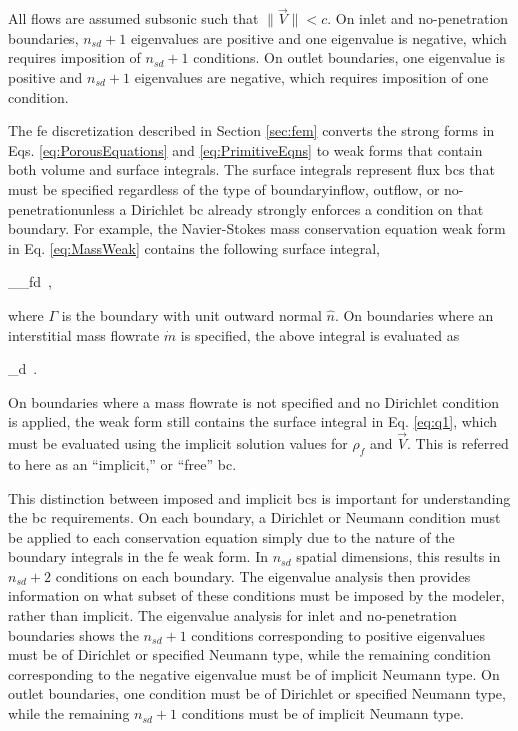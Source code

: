 All flows are assumed subsonic such that \(\|\vec{V}\|<c\). On inlet and no-penetration boundaries, \(n_{sd}+1\) eigenvalues are positive and one eigenvalue is negative, which requires imposition of \(n_{sd}+1\) conditions. On outlet boundaries, one eigenvalue is positive and \(n_{sd}+1\) eigenvalues are negative, which requires imposition of one condition.

The \gls{fe} discretization described in Section \ref{sec:fem} converts the strong forms in Eqs. \eqref{eq:PorousEquations} and \eqref{eq:PrimitiveEqns} to weak forms that contain both volume and surface integrals. The surface integrals represent flux \glspl{bc} that must be specified regardless of the type of boundary\mdash inflow, outflow, or no-penetration\mdash unless a Dirichlet \gls{bc} already strongly enforces a condition on that boundary. For example, the Navier-Stokes mass conservation equation weak form in Eq. \eqref{eq:MassWeak} contains the following surface integral,

\beq
\label{eq:q1}
\int_{\Gamma}\epsilon\rho_f\cdot{}d\Gamma\ ,
\eeq

\noindent where \(\Gamma\) is the boundary with unit outward normal \(\hat{n}\). On boundaries where an interstitial mass flowrate \(\dot{m}\) is specified, the above integral is evaluated as

\beq
\int_{\Gamma}\epsilon{}d\Gamma\ .
\eeq

\noindent On boundaries where a mass flowrate is not specified and no Dirichlet condition is applied, the weak form still contains the surface integral in Eq. \eqref{eq:q1}, which must be evaluated using the implicit solution values for \(\rho_f\) and \(\vec{V}\). This is referred to here as an ``implicit,'' or ``free'' \gls{bc}. 

This distinction between imposed and implicit \glspl{bc} is important for understanding the \gls{bc} requirements. On each boundary, a Dirichlet or Neumann condition must be applied to each conservation equation simply due to the nature of the boundary integrals in the \gls{fe} weak form. In \(n_{sd}\) spatial dimensions, this results in \(n_{sd}+2\) conditions on each boundary. The eigenvalue analysis then provides information on what subset of these conditions must be imposed by the modeler, rather than implicit. The eigenvalue analysis for inlet and no-penetration boundaries shows the \(n_{sd}+1\) conditions corresponding to positive eigenvalues must be of Dirichlet or specified Neumann type, while the remaining condition corresponding to the negative eigenvalue must be of implicit Neumann type. On outlet boundaries, one condition must be of Dirichlet or specified Neumann type, while the remaining \(n_{sd}+1\) conditions must be of implicit Neumann type. 

